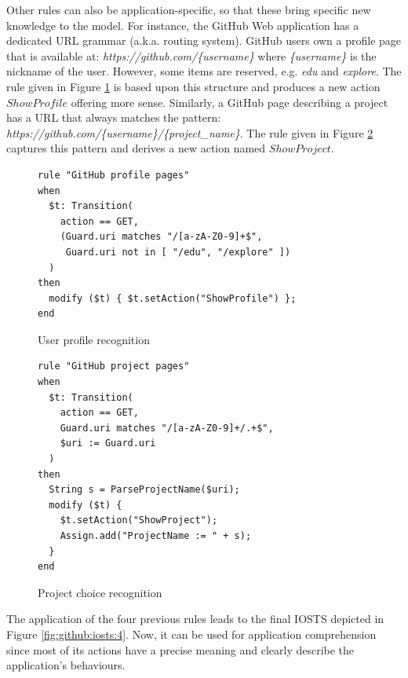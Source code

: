 Other rules can also be application-specific, so that these bring
specific new knowledge to the model. For instance, the GitHub Web
application has a dedicated URL grammar (a.k.a. routing system).
GitHub users own a profile page that is available at:
\emph{https://github.com/\{username\}} where \emph{\{username\}}
is the nickname of the user. However, some items are reserved,
e.g. \textit{edu} and \textit{explore}. The rule given in Figure
\ref{fig:rule:gh-profile} is based upon this structure and
produces a new action $ShowProfile$ offering more sense.
Similarly, a GitHub page describing a project has a URL that
always matches the pattern:
\emph{https://github.com/\{username\}/\{project\_name\}}. The
rule given in Figure \ref{fig:rule:gh-project} captures this
pattern and derives a new action named $ShowProject$.

\begin{figure}
\begin{framed}
\begin{BVerbatim}
rule "GitHub profile pages"
when
  $t: Transition(
    action == GET,
    (Guard.uri matches "/[a-zA-Z0-9]+$",
     Guard.uri not in [ "/edu", "/explore" ])
  )
then
  modify ($t) { $t.setAction("ShowProfile") };
end
\end{BVerbatim}
\end{framed}

\caption{User profile recognition}
\label{fig:rule:gh-profile}
\end{figure}

\begin{figure}
\begin{framed}
\begin{BVerbatim}
rule "GitHub project pages"
when
  $t: Transition(
    action == GET,
    Guard.uri matches "/[a-zA-Z0-9]+/.+$",
    $uri := Guard.uri
  )
then
  String s = ParseProjectName($uri);
  modify ($t) {
    $t.setAction("ShowProject");
    Assign.add("ProjectName := " + s);
  }
end
\end{BVerbatim}
\end{framed}

\caption{Project choice recognition}
\label{fig:rule:gh-project}
\end{figure}

\begin{example}
The application of the four previous rules leads to the final
IOSTS depicted in Figure \ref{fig:github:iosts:4}. Now, it can be
used for application comprehension since most of its actions have
a precise meaning and clearly describe the application's
behaviours.
\end{example}

